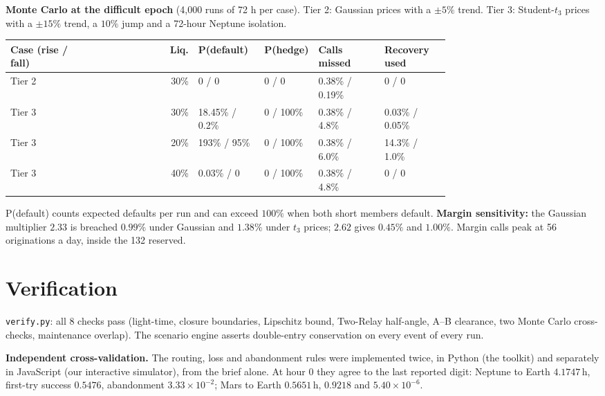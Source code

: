 \documentclass[11pt]{article}
\theoremstyle{definition}
\theoremstyle{remark}
\newcommand{\h}{\,\mathrm{h}}
\begin{document}
\textbf{Monte Carlo at the difficult epoch} (4{,}000 runs of 72 h per case). Tier 2: Gaussian prices with a $\pm5\%$ trend. Tier 3: Student-$t_3$ prices with a $\pm15\%$ trend, a $10\%$ jump and a 72-hour Neptune isolation.
\begin{table}[H]
\centering
\small
\begin{tabular}{@{}p{0.17\linewidth}rp{0.15\linewidth}p{0.12\linewidth}p{0.15\linewidth}p{0.15\linewidth}@{}}
\toprule
Case (rise / fall) & Liq. & P(default) & P(hedge) & Calls missed & Recovery used \\
\midrule
Tier 2 & 30\% & 0 / 0 & 0 / 0 & 0.38\% / 0.19\% & 0 / 0 \\
Tier 3 & 30\% & 18.45\% / 0.2\% & 0 / 100\% & 0.38\% / 4.8\% & 0.03\% / 0.05\% \\
Tier 3 & 20\% & 193\% / 95\% & 0 / 100\% & 0.38\% / 6.0\% & 14.3\% / 1.0\% \\
Tier 3 & 40\% & 0.03\% / 0 & 0 / 100\% & 0.38\% / 4.8\% & 0 / 0 \\
\bottomrule
\end{tabular}
\end{table}
P(default) counts expected defaults per run and can exceed $100\%$ when both short members default. \textbf{Margin sensitivity:} the Gaussian multiplier $2.33$ is breached $0.99\%$ under Gaussian and $1.38\%$ under $t_3$ prices; $2.62$ gives $0.45\%$ and $1.00\%$. Margin calls peak at 56 originations a day, inside the 132 reserved.

\section{Verification}\label{app:verify}
\texttt{verify.py}: all 8 checks pass (light-time, closure boundaries, Lipschitz bound, Two-Relay half-angle, A--B clearance, two Monte Carlo cross-checks, maintenance overlap). The scenario engine asserts double-entry conservation on every event of every run.

\textbf{Independent cross-validation.} The routing, loss and abandonment rules were implemented twice, in Python (the toolkit) and separately in JavaScript (our interactive simulator), from the brief alone. At hour 0 they agree to the last reported digit: Neptune to Earth $4.1747\h$, first-try success $0.5476$, abandonment $3.33\times10^{-2}$; Mars to Earth $0.5651\h$, $0.9218$ and $5.40\times10^{-6}$.
\end{document}
